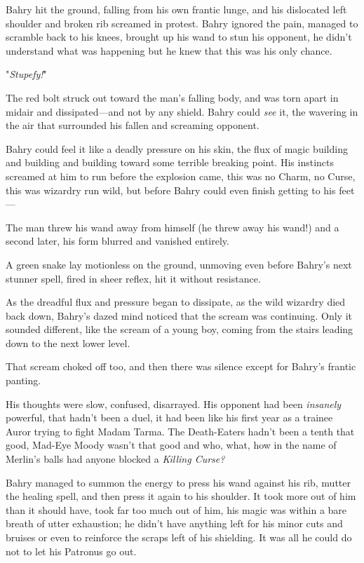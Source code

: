 Bahry hit the ground, falling from his own frantic lunge, and his dislocated
left shoulder and broken rib screamed in protest. Bahry ignored the pain,
managed to scramble back to his knees, brought up his wand to stun his
opponent, he didn't understand what was happening but he knew that this was his
only chance.

"\emph{Stupefy!}"

The red bolt struck out toward the man's falling body, and was torn apart in
midair and dissipated—and not by any shield. Bahry could \emph{see} it, the
wavering in the air that surrounded his fallen and screaming opponent.

Bahry could feel it like a deadly pressure on his skin, the flux of magic
building and building and building toward some terrible breaking point. His
instincts screamed at him to run before the explosion came, this was no Charm,
no Curse, this was wizardry run wild, but before Bahry could even finish
getting to his feet—

The man threw his wand away from himself (he threw away his wand!) and a second
later, his form blurred and vanished entirely.

A green snake lay motionless on the ground, unmoving even before Bahry's next
stunner spell, fired in sheer reflex, hit it without resistance.

As the dreadful flux and pressure began to dissipate, as the wild wizardry died
back down, Bahry's dazed mind noticed that the scream was continuing. Only it
sounded different, like the scream of a young boy, coming from the stairs
leading down to the next lower level.

That scream choked off too, and then there was silence except for Bahry's
frantic panting.

His thoughts were slow, confused, disarrayed. His opponent had been
\emph{insanely} powerful, that hadn't been a duel, it had been like his first
year as a trainee Auror trying to fight Madam Tarma. The Death-Eaters hadn't
been a tenth that good, Mad-Eye Moody wasn't that good{\el} and who, what,
how in the name of Merlin's balls had anyone blocked a \emph{Killing Curse?}

Bahry managed to summon the energy to press his wand against his rib, mutter
the healing spell, and then press it again to his shoulder. It took more out of
him than it should have, took far too much out of him, his magic was within a
bare breath of utter exhaustion; he didn't have anything left for his minor
cuts and bruises or even to reinforce the scraps left of his shielding. It was
all he could do not to let his Patronus go out.

